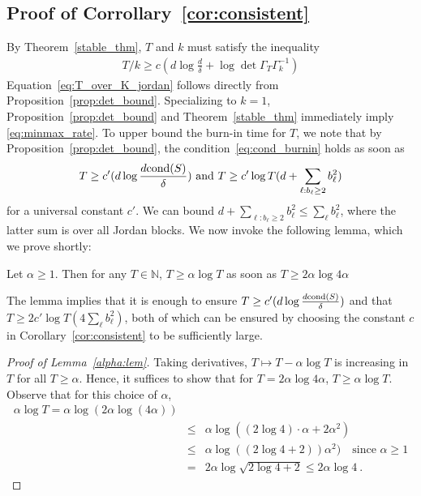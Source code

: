 \subsection{Proof of Corrollary~\ref{cor:consistent}}

By Theorem~\ref{stable_thm}, $T$ and $k$ must satisfy the inequality
\begin{eqnarray}\label{eq:cond_burnin}
T/k \ge c(d \log \frac{d}{\delta} + \log \det \Gamma_{T}\Gamma_{k}^{-1}) 
\end{eqnarray}
Equation~\eqref{eq:T_over_K_jordan} follows directly from Proposition~\ref{prop:det_bound}. Specializing to $k = 1$, Proposition~\ref{prop:det_bound} and Theorem~\ref{stable_thm} immediately imply \eqref{eq:minmax_rate}. To upper bound the burn-in time for $T$, we note that by Proposition~\ref{prop:det_bound}, the condition~\eqref{eq:cond_burnin} holds as soon as
\begin{eqnarray}\label{eq:diag_suff}
T \ge c'(d \log \frac{d\mathrm{cond}(S)}{\delta}) \text{ and } T \ge c' \log T(d+ \sum_{\ell:b_{\ell} \ge 2}b_{\ell}^2) 
\end{eqnarray}
for a universal constant $c'$. We can bound $d+ \sum_{\ell:b_{\ell} \ge 2}b_{\ell}^2 \le \sum_{\ell} b_{\ell}^2$, where the latter sum is over all Jordan blocks. We now invoke the following lemma, which we prove shortly:
\begin{lem}\label{alpha:lem}  Let $\alpha \ge 1$. Then for any $T \in \mathbb{N}$, $T \ge \alpha \log T$ as soon as $T \ge 2\alpha \log 4\alpha$
\end{lem}
The lemma implies that it is enough to ensure $T \ge c'(d \log \frac{d\mathrm{cond}(S)}{\delta})$ and that $T \ge 2c' \log T( 4\sum_{\ell} b_{\ell}^2) $, both of which can be ensured by choosing the constant $c$ in Corollary~\ref{cor:consistent} to be sufficiently large.

\begin{proof}[Proof of Lemma~\ref{alpha:lem}]
Taking derivatives, $T \mapsto T - \alpha \log T$ is increasing in $T$ for all $T \ge \alpha$. Hence, it suffices to show that for $T = 2\alpha \log 4\alpha$, $T \ge \alpha \log T$. Observe that for this choice of $\alpha$,
\begin{eqnarray*}
\alpha \log T = \alpha \log (2\alpha \log (4 \alpha) )\\
&\le& \alpha \log ((2\log 4)\cdot \alpha   + 2\alpha^2 )\\
&\le& \alpha \log ( (2 \log 4 + 2) )  \alpha^2) \quad \text{since } \alpha \ge 1\\
&=& 2\alpha \log \sqrt{ 2 \log 4 + 2} \le 2 \alpha \log 4~.
\end{eqnarray*}
\end{proof}


